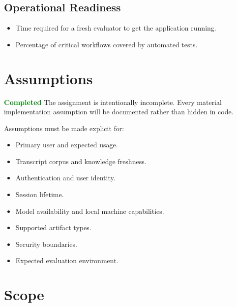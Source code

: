 \documentclass[11pt]{article}
\newcommand{\status}[1]{\textcolor{Green}{\textbf{#1}}}
\begin{document}
\subsection{Operational Readiness}
\begin{itemize}
  \item Time required for a fresh evaluator to get the application running.
  \item Percentage of critical workflows covered by automated tests.
\end{itemize}

\section{Assumptions}

\begin{statusbox}{\status{Completed}}
The assignment is intentionally incomplete. Every material implementation assumption will be documented rather than hidden in code.
\end{statusbox}

Assumptions must be made explicit for:
\begin{itemize}
  \item Primary user and expected usage.
  \item Transcript corpus and knowledge freshness.
  \item Authentication and user identity.
  \item Session lifetime.
  \item Model availability and local machine capabilities.
  \item Supported artifact types.
  \item Security boundaries.
  \item Expected evaluation environment.
\end{itemize}

\section{Scope}
\end{document}
